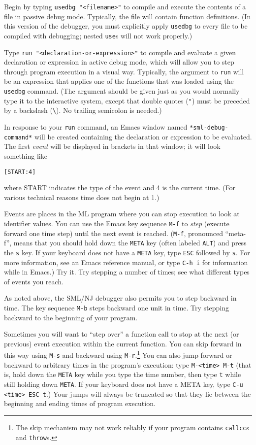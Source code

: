 Begin by typing 
\verb'usedbg "<filename>"' to compile and execute the contents of a
file in passive debug mode.  Typically, the file will contain function
definitions.  (In this version of the debugger, you must explicitly
apply \verb'usedbg' to every file to be compiled with debugging; nested
\verb'use's will not work properly.)

Type \verb'run "<declaration-or-expression>"' to compile and evaluate a
given declaration or expression in active debug mode, which will allow you 
to step through program execution in a visual way.  
Typically, the argument to \verb'run' will be an expression that applies
one of the functions that was loaded using the \verb'usedbg' command. 
(The argument should be given just as you would normally type
it to the interactive system, except that double quotes (\verb'"') must 
be preceded by a backslash (\verb'\'). No trailing semicolon is needed.)

In response to your \verb'run' command, an Emacs window named
\verb'*sml-debug-command*' will be created containing the declaration or
expression to be evaluated. The first {\em event} will be displayed 
in brackets in that window; it will look something like

\begin{verbatim}
[START:4]
\end{verbatim}
where START indicates the type of the event and 4 is the current
time.  (For various technical reasons time does not begin at 1.)

Events are places in the ML program where you can stop execution to
look at identifier values.  You can use the Emacs key sequence \verb'M-f' to
{\em step} (execute forward one time step) until the next event is reached.
(\verb'M-f', pronounced ``meta-f'', means that you should hold down
the \verb'META' key (often labeled \verb'ALT') and press the \verb's'
key.  If your keyboard does not have a \verb'META' key,
type \verb'ESC' followed by \verb's'.  For more information, see an
Emacs reference manual, or type \verb'C-h i' for information while in Emacs.)
Try it.  Try stepping a number of times; see what different types of
events you reach.

As noted above, the SML/NJ debugger also permits you to step {\em}
backward in time.  The key sequence \verb'M-b' steps backward one unit in
time.  Try stepping backward to the beginning of your program.

Sometimes you will want to ``step over'' a function call to stop at the
next (or previous) event execution within the current function.
You can skip forward in this way using \verb'M-s' and backward using 
\verb'M-r'.\footnote{The skip mechanism may not work reliably if your
program contains \verb'callcc's and \verb'throw's.}
You can also jump forward or backward to arbitrary times in the 
program's execution: type \verb'M-<time> M-t' (that is,
hold down the \verb'META' key while you type the time number,
then type \verb't' while still holding down \verb'META'.  If your
keyboard does not have a META key, type \verb'C-u <time> ESC t'.)
Your jumps will always be truncated so that they lie between the
beginning and ending times of program execution.

